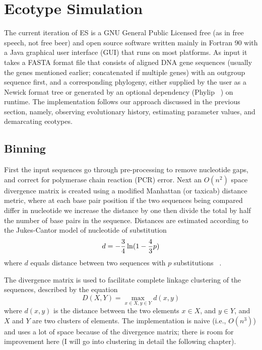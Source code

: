 \section{Ecotype Simulation}
%
%
The current iteration of ES is a GNU General Public Licensed free (as in free speech, not free beer) and open source software written mainly in Fortran 90 with a Java graphical user interface (GUI) that runs on most platforms.
As input it takes a FASTA format file that consists of aligned DNA gene sequences (usually the genes mentioned earlier; concatenated if multiple genes) with an outgroup sequence first, and a corresponding phylogeny, either supplied by the user as a Newick format tree or generated by an optional dependency (Phylip ~\cite{felsenstein1989phylip}) on runtime.
The implementation follows our approach discussed in the previous section, namely, observing evolutionary history, estimating parameter values, and demarcating ecotypes.

\subsection*{Binning}
First the input sequences go through pre-processing to remove nucleotide gaps, and correct for polymerase chain reaction (PCR) error.
Next an $O(n^2)$ space divergence matrix is created using a modified Manhattan (or taxicab) distance metric, where at each base pair position if the two sequences being compared differ in nucleotide we increase the distance by one then divide the total by half the number of base pairs in the sequence.
Distances are estimated according to the Jukes-Cantor model of nucleotide of substitution$$d=-{3\over4} \ln({1-{4\over3}p})$$where $d$ equals distance between two sequences with $p$ substitutions ~\cite{jukes1969evolution}.

The divergence matrix is used to facilitate complete linkage clustering of the sequences, described by the equation $$D(X,Y)= \max_{x\in X, y\in Y} d(x,y)$$ where $d(x,y)$ is the distance between the two elements $x \in X$, and $y \in Y$, and $X$ and $Y$ are two clusters of elements.
The implementation is naive (i.e., $O(n^3)$) and uses a lot of space because of the divergence matrix; there is room for improvement here (I will go into clustering in detail the following chapter). 

